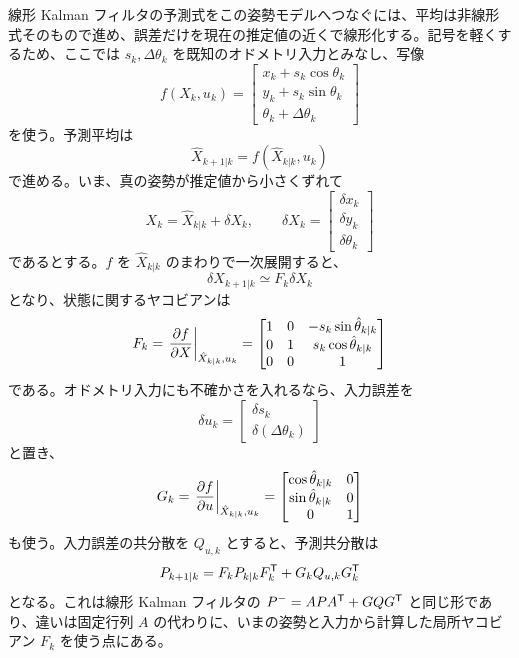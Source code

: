 線形 Kalman フィルタの予測式をこの姿勢モデルへつなぐには、平均は非線形式そのもので進め、誤差だけを現在の推定値の近くで線形化する。記号を軽くするため、ここでは $s_k,\Delta\theta_k$ を既知のオドメトリ入力とみなし、写像
\begin{equation}
  f(X_k,u_k)=
  \begin{bmatrix}
    x_k+s_k\cos\theta_k\\
    y_k+s_k\sin\theta_k\\
    \theta_k+\Delta\theta_k
  \end{bmatrix}
\end{equation}
を使う。予測平均は
\begin{equation}
  \hat{X}_{k+1|k}=f(\hat{X}_{k|k},u_k)
\end{equation}
で進める。いま、真の姿勢が推定値から小さくずれて
\begin{equation}
  X_k=\hat{X}_{k|k}+\delta X_k,
  \qquad
  \delta X_k=
  \begin{bmatrix}
    \delta x_k\\ \delta y_k\\ \delta\theta_k
  \end{bmatrix}
\end{equation}
であるとする。$f$ を $\hat{X}_{k|k}$ のまわりで一次展開すると、
\begin{equation}
  \delta X_{k+1|k}\simeq F_k\delta X_k
\end{equation}
となり、状態に関するヤコビアンは
\begin{equation}
  F_k=
  \left.\frac{\partial f}{\partial X}\right|_{\hat{X}_{k|k},u_k}
  =
  \begin{bmatrix}
    1&0&-s_k\sin\hat{\theta}_{k|k}\\
    0&1& s_k\cos\hat{\theta}_{k|k}\\
    0&0&1
  \end{bmatrix}
  \label{eq:flow-six-pose-jacobian}
\end{equation}
である。オドメトリ入力にも不確かさを入れるなら、入力誤差を
\begin{equation}
  \delta u_k=
  \begin{bmatrix}
    \delta s_k\\ \delta(\Delta\theta_k)
  \end{bmatrix}
\end{equation}
と置き、
\begin{equation}
  G_k=
  \left.\frac{\partial f}{\partial u}\right|_{\hat{X}_{k|k},u_k}
  =
  \begin{bmatrix}
    \cos\hat{\theta}_{k|k}&0\\
    \sin\hat{\theta}_{k|k}&0\\
    0&1
  \end{bmatrix}
\end{equation}
も使う。入力誤差の共分散を $Q_{u,k}$ とすると、予測共分散は
\begin{equation}
  P_{k+1|k}
  =
  F_kP_{k|k}F_k^{\mathsf{T}}+G_kQ_{u,k}G_k^{\mathsf{T}}
  \label{eq:flow-six-pose-covariance-prediction}
\end{equation}
となる。これは線形 Kalman フィルタの $P^-=APA^{\mathsf{T}}+GQG^{\mathsf{T}}$ と同じ形であり、違いは固定行列 $A$ の代わりに、いまの姿勢と入力から計算した局所ヤコビアン $F_k$ を使う点にある。

